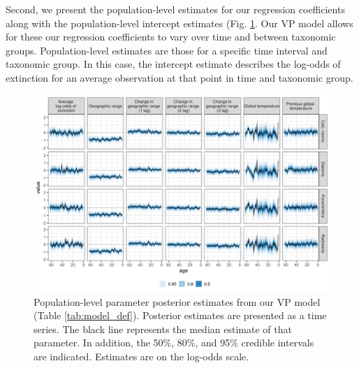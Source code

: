 \documentclass[12pt,letterpaper]{article}
\begin{document}
\begin{refsection}
Second, we present the population-level estimates for our regression coefficients along with the population-level intercept estimates (Fig. \ref{fig:param_est_time_group}. Our VP model allows for these our regression coefficients to vary over time and between taxonomic groups. Population-level estimates are those for a specific time interval and taxonomic group. In this case, the intercept estimate describes the log-odds of extinction for an average observation at that point in time and taxonomic group.

\begin{figure}[ht]
  \centering
  \includegraphics[width=\textwidth,height=\textheight,keepaspectratio=true]{../results/figure/eff_time_group}
  \caption{Population-level parameter posterior estimates from our VP model (Table \ref{tab:model_def}). Posterior estimates are presented as a time series. The black line represents the median estimate of that parameter. In addition, the 50\%, 80\%, and 95\% credible intervals are indicated. Estimates are on the log-odds scale.}
  \label{fig:param_est_time_group}
\end{figure}



\printbibliography[title={Supplementary References}]
\end{refsection}
\end{document}
